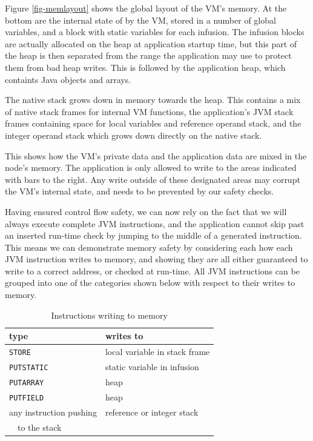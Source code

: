 Figure \ref{fig-memlayout} shows the global layout of the VM's memory. At the bottom are the internal state of by the VM, stored in a number of global variables, and a block with static variables for each infusion. The infusion blocks are actually allocated on the heap at application startup time, but this part of the heap is then separated from the range the application may use to protect them from bad heap writes. This is followed by the application heap, which containts Java objects and arrays.

The native stack grows down in memory towards the heap. This contains a mix of native stack frames for internal VM functions, the application's JVM stack frames containing space for local variables and reference operand stack, and the integer operand stack which grows down directly on the native stack.

This shows how the VM's private data and the application data are mixed in the node's memory. The application is only allowed to write to the areas indicated with bars to the right. Any write outside of these designated areas may corrupt the VM's internal state, and needs to be prevented by our safety checks.

Having ensured control flow safety, we can now rely on the fact that we will always execute complete JVM instructions, and the application cannot skip past an inserted run-time check by jumping to the middle of a generated instruction. This means we can demonstrate memory safety by considering each how each JVM instruction writes to memory, and showing they are all either guaranteed to write to a correct address, or checked at run-time. All JVM instructions can be grouped into one of the categories shown below with respect to their writes to memory.

\begin{table}[H]
\centering
\caption{Instructions writing to memory}
\label{tbl-control-flow-instructions}
\begin{tabular}{ll}
\toprule
type     & writes to \\
\midrule
\texttt{STORE}                   & local variable in stack frame \\
\texttt{PUTSTATIC}               & static variable in infusion \\
\texttt{PUTARRAY}                & heap \\
\texttt{PUTFIELD}                & heap \\
any instruction pushing          & reference or integer stack \\
~~to the stack                   & \\
\bottomrule
\end{tabular}
\end{table}


